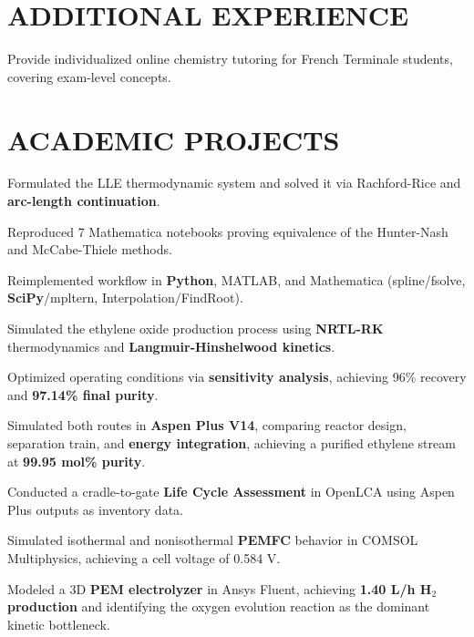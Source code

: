 \documentclass[10pt]{article}
\begin{document}
\section{ADDITIONAL EXPERIENCE}
\begin{bul}
\item Provide individualized online chemistry tutoring for French Terminale students, covering exam-level concepts.
\end{bul}

\section{ACADEMIC PROJECTS}
\begin{bul}
\item Formulated the LLE thermodynamic system and solved it via Rachford-Rice and \textbf{arc-length continuation}.
\item Reproduced 7 Mathematica notebooks proving equivalence of the Hunter-Nash and McCabe-Thiele methods.
\item Reimplemented workflow in \textbf{Python}, MATLAB, and Mathematica (spline/fsolve, \textbf{SciPy}/mpltern, Interpolation/FindRoot).
\end{bul}
\begin{bul}
\item Simulated the ethylene oxide production process using \textbf{NRTL-RK} thermodynamics and \textbf{Langmuir-Hinshelwood kinetics}.
\item Optimized operating conditions via \textbf{sensitivity analysis}, achieving 96\% recovery and \textbf{97.14\% final purity}.
\end{bul}
\begin{bul}
\item Simulated both routes in \textbf{Aspen Plus V14}, comparing reactor design, separation train, and \textbf{energy integration}, achieving a purified ethylene stream at \textbf{99.95 mol\% purity}.
\item Conducted a cradle-to-gate \textbf{Life Cycle Assessment} in OpenLCA using Aspen Plus outputs as inventory data.
\end{bul}
\begin{bul}
\item Simulated isothermal and nonisothermal \textbf{PEMFC} behavior in COMSOL Multiphysics, achieving a cell voltage of 0.584 V.
\item Modeled a 3D \textbf{PEM electrolyzer} in Ansys Fluent, achieving \textbf{1.40 L/h H$_2$ production} and identifying the oxygen evolution reaction as the dominant kinetic bottleneck.
\end{bul}
\end{document}
